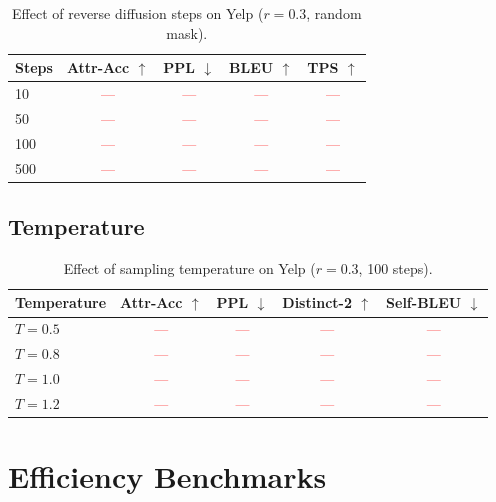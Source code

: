 \documentclass{article}
\newcommand{\tbd}[1]{\textcolor{red}{#1}}  %
\begin{document}
\begin{table}[h]
\centering
\caption{Effect of reverse diffusion steps on Yelp ($r=0.3$, random mask).}
\label{tab:ablation_steps}
\small
\begin{tabular}{lcccc}
\toprule
\textbf{Steps} & \textbf{Attr-Acc} $\uparrow$ & \textbf{PPL} $\downarrow$ & \textbf{BLEU} $\uparrow$ & \textbf{TPS} $\uparrow$ \\
\midrule
10 & \tbd{---} & \tbd{---} & \tbd{---} & \tbd{---} \\
50 & \tbd{---} & \tbd{---} & \tbd{---} & \tbd{---} \\
100 & \tbd{---} & \tbd{---} & \tbd{---} & \tbd{---} \\
500 & \tbd{---} & \tbd{---} & \tbd{---} & \tbd{---} \\
\bottomrule
\end{tabular}
\end{table}

\subsection{Temperature}

\begin{table}[h]
\centering
\caption{Effect of sampling temperature on Yelp ($r=0.3$, 100 steps).}
\label{tab:ablation_temperature}
\small
\begin{tabular}{lcccc}
\toprule
\textbf{Temperature} & \textbf{Attr-Acc} $\uparrow$ & \textbf{PPL} $\downarrow$ & \textbf{Distinct-2} $\uparrow$ & \textbf{Self-BLEU} $\downarrow$ \\
\midrule
$T = 0.5$ & \tbd{---} & \tbd{---} & \tbd{---} & \tbd{---} \\
$T = 0.8$ & \tbd{---} & \tbd{---} & \tbd{---} & \tbd{---} \\
$T = 1.0$ & \tbd{---} & \tbd{---} & \tbd{---} & \tbd{---} \\
$T = 1.2$ & \tbd{---} & \tbd{---} & \tbd{---} & \tbd{---} \\
\bottomrule
\end{tabular}
\end{table}

\section{Efficiency Benchmarks}
\label{app:efficiency}
\end{document}

